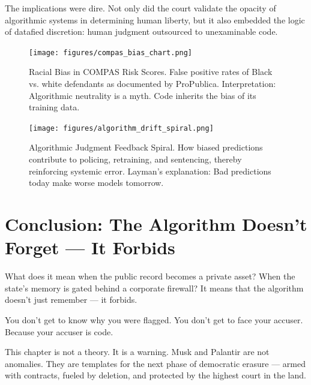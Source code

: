 The implications were dire. Not only did the court validate the opacity of algorithmic systems in determining human liberty, but it also embedded the logic of datafied discretion: human judgment outsourced to unexaminable code.

\begin{figure}[h!]
  \centering
  \texttt{[image: figures/compas\_bias\_chart.png]}
  \caption{Racial Bias in COMPAS Risk Scores. False positive rates of Black vs. white defendants as documented by ProPublica. Interpretation: Algorithmic neutrality is a myth. Code inherits the bias of its training data.}
\end{figure}

\begin{figure}[h!]
  \centering
  \texttt{[image: figures/algorithm\_drift\_spiral.png]}
  \caption{Algorithmic Judgment Feedback Spiral. How biased predictions contribute to policing, retraining, and sentencing, thereby reinforcing systemic error. Layman's explanation: Bad predictions today make worse models tomorrow.}
\end{figure}

\section*{Conclusion: The Algorithm Doesn’t Forget — It Forbids}
What does it mean when the public record becomes a private asset? When the state’s memory is gated behind a corporate firewall? It means that the algorithm doesn’t just remember — it forbids.

You don’t get to know why you were flagged.  
You don’t get to face your accuser.  
Because your accuser is code.

This chapter is not a theory. It is a warning.  
Musk and Palantir are not anomalies.  
They are templates for the next phase of democratic erasure — armed with contracts, fueled by deletion, and protected by the highest court in the land.


